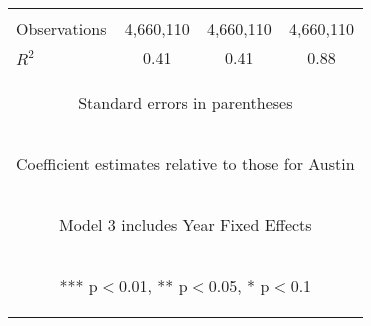 \begin{center}
\begin{tabular}{lccc}
\vspace{4pt} & \begin{footnotesize}\end{footnotesize} & \begin{footnotesize}\end{footnotesize} & \begin{footnotesize}\end{footnotesize} \\
Observations & 4,660,110 & 4,660,110 & 4,660,110 \\
 $R^2$ & 0.41 & 0.41 & 0.88 \\ \hline
\multicolumn{4}{c}{\begin{footnotesize} Standard errors in parentheses\end{footnotesize}} \\
\multicolumn{4}{c}{\begin{footnotesize} Coefficient estimates relative to those for Austin\end{footnotesize}} \\
\multicolumn{4}{c}{\begin{footnotesize} Model 3 includes Year Fixed Effects\end{footnotesize}} \\
\multicolumn{4}{c}{\begin{footnotesize} *** p$<$0.01, ** p$<$0.05, * p$<$0.1\end{footnotesize}} \\
\end{tabular}
\end{center}
